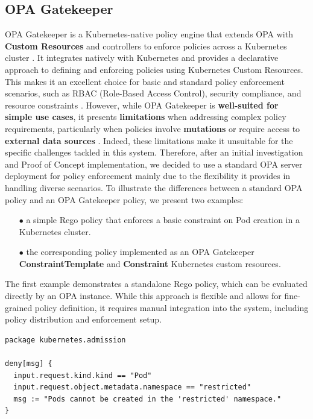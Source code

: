 \subsection{OPA Gatekeeper}

OPA Gatekeeper is a Kubernetes-native policy engine that extends OPA with \textbf{Custom Resources} and controllers to enforce policies across a Kubernetes cluster \cite{opa_gatekeeper}. 
It integrates natively with Kubernetes and provides a declarative approach to defining and enforcing policies using Kubernetes Custom Resources. 
This makes it an excellent choice for basic and standard policy enforcement scenarios, such as RBAC (Role-Based Access Control), security compliance, and resource constraints \cite{opa_gatekeeper}.
However, while OPA Gatekeeper is \textbf{well-suited for simple use cases}, it presents \textbf{limitations} when addressing complex policy requirements, particularly when policies involve \textbf{mutations} or require access to \textbf{external data sources} \cite{opa_gatekeeper_external_data}. 
Indeed, these limitations make it unsuitable for the specific challenges tackled in this system. 
Therefore, after an initial investigation and Proof of Concept implementation, we decided to use a standard OPA server deployment for policy enforcement mainly due to the flexibility it provides in handling diverse scenarios.
To illustrate the differences between a standard OPA policy and an OPA Gatekeeper policy, we present two examples:  
\begin{itemize}[itemsep=0.2pt, topsep=1pt]
  \item[$\bullet$] a simple Rego policy that enforces a basic constraint on Pod creation in a Kubernetes cluster.
  \item[$\bullet$] the corresponding policy implemented as an OPA Gatekeeper \textbf{ConstraintTemplate} and \textbf{Constraint} Kubernetes custom resources.
\end{itemize}

The first example demonstrates a standalone Rego policy, which can be evaluated directly by an OPA instance. 
While this approach is flexible and allows for fine-grained policy definition, it requires manual integration into the system, including policy distribution and enforcement setup.  

\begin{lstlisting}[language=rego, caption={Simple OPA Rego Policy}, label={lst:opa-rego}]
package kubernetes.admission

deny[msg] {
  input.request.kind.kind == "Pod"
  input.request.object.metadata.namespace == "restricted"
  msg := "Pods cannot be created in the 'restricted' namespace."
}
\end{lstlisting}

